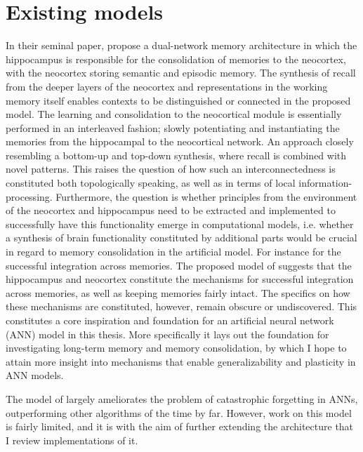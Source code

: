 \section{Existing models}\label{chpt:existing-models}

In their seminal paper, \cite{McClelland1995} propose a dual-network memory architecture in which the hippocampus is responsible for the consolidation of memories to the neocortex, with the neocortex storing semantic and episodic memory. The synthesis of recall from the deeper layers of the neocortex and representations in the working memory itself enables contexts to be distinguished or connected in the proposed model. The learning and consolidation to the neocortical module is essentially performed in an interleaved fashion; slowly potentiating and instantiating the memories from the hippocampal to the neocortical network. An approach closely resembling a bottom-up and top-down synthesis, where recall is combined with novel patterns. This raises the question of how such an interconnectedness is constituted both topologically speaking, as well as in terms of local information-processing. Furthermore, the question is whether principles from the environment of the neocortex and hippocampus need to be extracted and implemented to successfully have this functionality emerge in computational models, i.e. whether a synthesis of brain functionality constituted by additional parts would be crucial in regard to memory consolidation in the artificial model. For instance for the successful integration across memories. The proposed model of \citep{McClelland1995} suggests that the hippocampus and neocortex constitute the mechanisms for successful integration across memories, as well as keeping memories fairly intact. The specifics on how these mechanisms are constituted, however, remain obscure or undiscovered. This constitutes a core inspiration and foundation for an artificial neural network (ANN) model in this thesis. More specifically it lays out the foundation for investigating long-term memory and memory consolidation, by which I hope to attain more insight into mechanisms that enable generalizability and plasticity in ANN models.

The model of \cite{McClelland1995} largely ameliorates the problem of catastrophic forgetting in ANNs, outperforming other algorithms of the time by far. However, work on this model is fairly limited, and it is with the aim of further extending the architecture that I review implementations of it.

